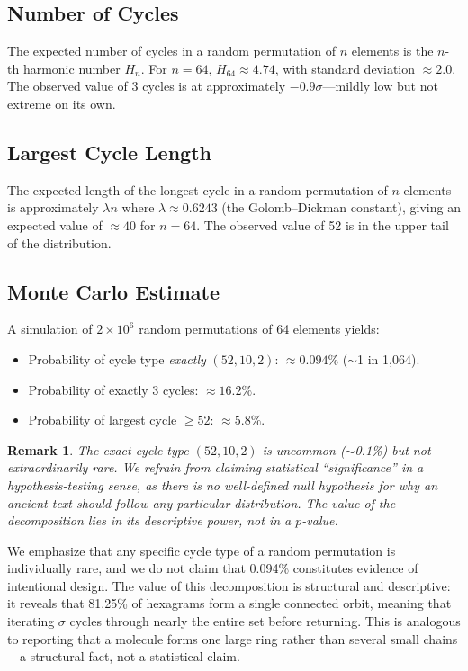 \documentclass[11pt,a4paper]{article}
\newtheorem{remark}{Remark}
\begin{document}
\subsection{Number of Cycles}

The expected number of cycles in a random permutation of $n$ elements is the $n$-th harmonic number $H_n$.
For $n = 64$, $H_{64} \approx 4.74$, with standard deviation $\approx 2.0$.
The observed value of 3 cycles is at approximately $-0.9\sigma$---mildly low but not extreme on its own.

\subsection{Largest Cycle Length}

The expected length of the longest cycle in a random permutation of $n$ elements is approximately $\lambda n$ where $\lambda \approx 0.6243$ (the Golomb--Dickman constant), giving an expected value of $\approx 40$ for $n=64$.
The observed value of 52 is in the upper tail of the distribution.

\subsection{Monte Carlo Estimate}

A simulation of $2 \times 10^6$ random permutations of 64 elements yields:
\begin{itemize}
  \item Probability of cycle type \emph{exactly} $(52,10,2)$: $\approx 0.094\%$ ($\sim$1 in 1{,}064).
  \item Probability of exactly 3 cycles: $\approx 16.2\%$.
  \item Probability of largest cycle $\geq 52$: $\approx 5.8\%$.
\end{itemize}

\begin{remark}
  The exact cycle type $(52,10,2)$ is uncommon ($\sim$0.1\%) but not extraordinarily rare.
  We refrain from claiming statistical ``significance'' in a hypothesis-testing sense, as there is no well-defined null hypothesis for why an ancient text should follow any particular distribution.
  The value of the decomposition lies in its descriptive power, not in a $p$-value.
\end{remark}

We emphasize that any specific cycle type of a random permutation is individually rare, and we do not claim that 0.094\% constitutes evidence of intentional design. The value of this decomposition is structural and descriptive: it reveals that 81.25\% of hexagrams form a single connected orbit, meaning that iterating $\sigma$ cycles through nearly the entire set before returning. This is analogous to reporting that a molecule forms one large ring rather than several small chains---a structural fact, not a statistical claim.
\end{document}
